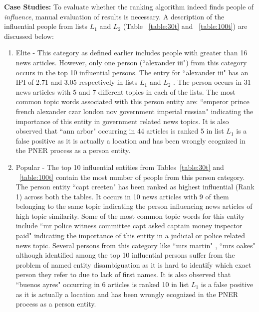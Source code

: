 \noindent \textbf{Case Studies: } To evaluate whether the ranking algorithm indeed finds people of \emph{influence}, manual evaluation of results is necessary. A description of the influential people from lists $L_1$ and $L_2$  (Table ~\ref{table:30t} and ~\ref{table:100t}) are discussed below: 
\begin{enumerate}

\item Elite - This category as defined earlier includes people with greater than 16 news articles. However, only one person  (``alexander iii") from this category occurs in the top 10 influential persons. The entry for ``alexander iii" has an IPI of 2.71 and 3.05 respectively in lists $L_1$ and $L_2$ . The person occurs in 31 news articles with 5 and 7 different topics in each of the lists. The most common topic words associated with this person entity are: ``emperor prince french alexander czar london nov government imperial russian" indicating the importance of this entity in government related news topics. 
It is also observed that ``ann arbor" occurring in 44 articles is ranked 5 in list $L_1$ is a false positive as it is actually a location and has been wrongly ecognized in the PNER process as a person entity. 

\item Popular - The top 10 influential entities from Tables~\ref{table:30t} and ~\ref{table:100t} contain the most number of people from this person category. The person entity ``capt creeten" has been ranked as highest influential (Rank 1) across both the tables. It occurs in 10 news articles with 9 of them belonging to the same topic indicating the person influencing news articles of high topic similarity. Some of the most common topic words for this entity include ``mr police witness committee capt asked captain money inspector paid" indicating the importance of this entity in a judicial or police related news topic.
Several persons from this category like ``mrs martin" , ``mrs oakes"  although identified among the top 10 influential persons suffer from the problem of named entity disambiguation as it is hard to identify which exact person they refer to due to lack of first names.
It is also observed that ``buenos ayres" occurring in 6 articles is ranked 10 in list $L_1$ is a false positive as it is actually a location and has been wrongly ecognized in the PNER process as a person entity. 
 

\end{enumerate}
